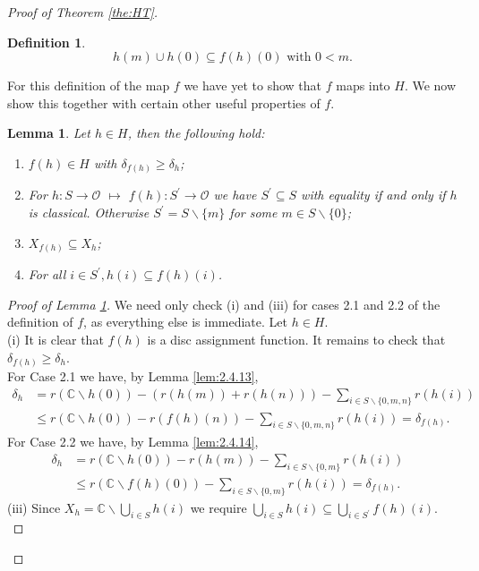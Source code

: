 \documentclass{strippedproc-l}
\newtheorem{lemma}[theorem]{Lemma}
\theoremstyle{definition}
\newtheorem{definition}[theorem]{Definition}
\theoremstyle{remark}
\numberwithin{equation}{section}
\begin{document}
\begin{proof}[Proof of Theorem \ref{the:HT}]
\begin{definition}
\begin{equation}
h(m)\cup h(0)\subseteq f(h)(0)\mbox{ with }0<m.
\label{equ:sset2}
\end{equation}
\label{def:fHtoH}
\end{definition}
For this definition of the map $f$ we have yet to show that $f$ maps into $H$. We now show this together with certain other useful properties of $f$.
\begin{lemma}Let $h\in H$, then the following hold:
\begin{enumerate}
\item[\textup{(i)}]
$f(h)\in H$ with $\delta_{f(h)}\geq\delta_{h}$;
\item[\textup{(ii)}]
For $h:S\rightarrow\mathcal{O}$ $\mapsto$ $f(h):S^{'}\rightarrow\mathcal{O}$ we have $S^{'}\subseteq S$ with equality if and only if $h$ is classical. Otherwise $S^{'}=S\backslash\{m\}$ for some $m\in S\backslash\{0\}$;
\item[\textup{(iii)}]
$X_{f(h)}\subseteq X_{h}$;
\item[\textup{(iv)}]
For all $i\in S^{'}, h(i)\subseteq f(h)(i)$.
\end{enumerate}
\label{lem:f}
\end{lemma}
\begin{proof}[Proof of Lemma \ref{lem:f}]
We need only check (i) and (iii) for cases 2.1 and 2.2 of the definition of $f$, as everything else is immediate. Let $h\in H$.\\
(i) It is clear that $f(h)$ is a disc assignment function. It remains to check that $\delta_{f(h)}\geq\delta_{h}$.\\ 
For Case 2.1 we have, by Lemma \ref{lem:2.4.13},
\begin{align*}
\delta_{h}&=r(\mathbb{C}\backslash h(0))-(r(h(m))+r(h(n)))-\sum_{i\in S\backslash\{0,m,n\}}r(h(i))&\\
&\le r(\mathbb{C}\backslash h(0))-r(f(h)(n))-\sum_{i\in S\backslash\{0,m,n\}}r(h(i))=\delta_{f(h)}.&
\end{align*}
For Case 2.2 we have, by Lemma \ref{lem:2.4.14},
\begin{align*}
\delta_{h}&=r(\mathbb{C}\backslash h(0))-r(h(m))-\sum_{i\in S\backslash\{0,m\}}r(h(i))&\\
&\le r(\mathbb{C}\backslash f(h)(0))-\sum_{i\in S\backslash\{0,m\}}r(h(i))=\delta_{f(h)}.&
\end{align*}
(iii) Since $X_{h}=\mathbb{C}\backslash\bigcup_{i\in S}h(i)$ we require $\bigcup_{i\in S}h(i)\subseteq\bigcup_{i\in S^{'}}f(h)(i)$.\\

\end{proof}
\end{proof}
\end{document}
